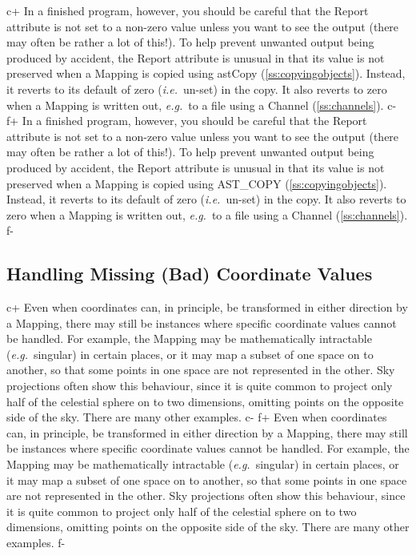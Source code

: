 \documentclass[twoside,11pt]{article}
\newcommand{\secref}[1]{\S\ref{#1}}
\renewcommand{\secref}[1]{\ref{#1}}
\begin{document}
c+
In a finished program, however, you should be careful that the Report
attribute is not set to a non-zero value unless you want to see the
output (there may often be rather a lot of this!). To help prevent
unwanted output being produced by accident, the Report attribute is
unusual in that its value is not preserved when a Mapping is copied
using astCopy (\secref{ss:copyingobjects}). Instead, it reverts to its
default of zero ({\em{i.e.}}\ un-set) in the copy. It also reverts to
zero when a Mapping is written out, {\em{e.g.}}\ to a file using a
Channel (\secref{ss:channels}).
c-
f+
In a finished program, however, you should be careful that the Report
attribute is not set to a non-zero value unless you want to see the
output (there may often be rather a lot of this!). To help prevent
unwanted output being produced by accident, the Report attribute is
unusual in that its value is not preserved when a Mapping is copied
using AST\_COPY (\secref{ss:copyingobjects}). Instead, it reverts to
its default of zero ({\em{i.e.}}\ un-set) in the copy. It also reverts
to zero when a Mapping is written out, {\em{e.g.}}\ to a file using a
Channel (\secref{ss:channels}).
f-


\subsection{\label{ss:badcoordinates}Handling Missing (Bad) Coordinate Values}

c+
Even when coordinates can, in principle, be transformed in either
direction by a Mapping, there may still be instances where specific
coordinate values cannot be handled. For example, the Mapping may be
mathematically intractable ({\em{e.g.}}\ singular) in certain places,
or it may map a subset of one space on to another, so that some points
in one space are not represented in the other.  Sky projections often
show this behaviour, since it is quite common to project only half of
the celestial sphere on to two dimensions, omitting points on the
opposite side of the sky. There are many other examples.
c-
f+
Even when coordinates can, in principle, be transformed in either
direction by a Mapping, there may still be instances where specific
coordinate values cannot be handled. For example, the Mapping may be
mathematically intractable ({\em{e.g.}}\ singular) in certain places,
or it may map a subset of one space on to another, so that some points
in one space are not represented in the other.  Sky projections often
show this behaviour, since it is quite common to project only half of
the celestial sphere on to two dimensions, omitting points on the
opposite side of the sky. There are many other examples.
f-
\end{document}
